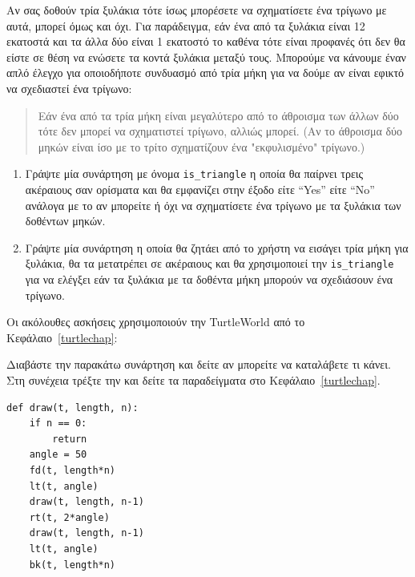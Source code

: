 \documentclass[10pt]{book}
\begin{document}
\begin{exercise}

Αν σας δοθούν τρία ξυλάκια τότε ίσως μπορέσετε να σχηματίσετε ένα τρίγωνο με αυτά, μπορεί όμως και όχι. Για παράδειγμα, εάν ένα από τα ξυλάκια είναι 12 εκατοστά και τα άλλα δύο είναι 1 εκατοστό το καθένα τότε είναι προφανές ότι δεν θα είστε σε θέση να ενώσετε τα κοντά ξυλάκια μεταξύ τους. Μπορούμε να κάνουμε έναν απλό έλεγχο για οποιοδήποτε συνδυασμό από τρία μήκη για να δούμε αν είναι εφικτό να σχεδιαστεί ένα τρίγωνο:

\begin{quotation}

Εάν ένα από τα τρία μήκη είναι μεγαλύτερο από το άθροισμα των άλλων δύο 
τότε δεν μπορεί να σχηματιστεί τρίγωνο, αλλιώς μπορεί. (Αν το άθροισμα δύο μηκών είναι ίσο με το τρίτο σχηματίζουν ένα "εκφυλισμένο" τρίγωνο.)
\end{quotation}

\begin{enumerate}


\item Γράψτε μία συνάρτηση με όνομα  \verb"is_triangle"  η οποία θα
  παίρνει τρεις ακέραιους σαν ορίσματα και θα εμφανίζει στην έξοδο είτε 
  ``Yes'' είτε ``No'' ανάλογα με το αν μπορείτε ή όχι να σχηματίσετε
  ένα τρίγωνο με τα ξυλάκια των δοθέντων μηκών.

\item Γράψτε μία συνάρτηση η οποία θα ζητάει από το χρήστη να εισάγει τρία
  μήκη για ξυλάκια, θα τα μετατρέπει σε ακέραιους και θα χρησιμοποιεί την 
  \verb"is_triangle"  για να ελέγξει εάν τα ξυλάκια με τα δοθέντα μήκη
  μπορούν να σχεδιάσουν ένα τρίγωνο.\\

\end{enumerate}

\end{exercise}
Οι ακόλουθες ασκήσεις χρησιμοποιούν την  TurtleWorld  από το Κεφάλαιο~\ref{turtlechap}:


\begin{exercise}

Διαβάστε την παρακάτω συνάρτηση και δείτε αν μπορείτε να καταλάβετε τι κάνει.
Στη συνέχεια τρέξτε την και δείτε τα παραδείγματα στο Κεφάλαιο~\ref{turtlechap}.

\begin{verbatim}
def draw(t, length, n):
    if n == 0:
        return
    angle = 50
    fd(t, length*n)
    lt(t, angle)
    draw(t, length, n-1)
    rt(t, 2*angle)
    draw(t, length, n-1)
    lt(t, angle)
    bk(t, length*n)
\end{verbatim}

\end{exercise}
\end{document}
